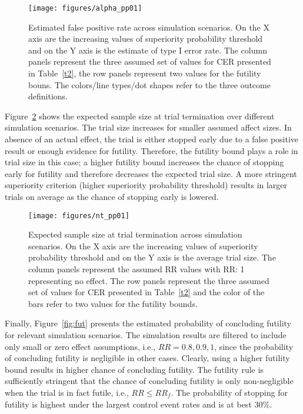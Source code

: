 \documentclass[12pt]{article}
\begin{document}
\begin{figure}[t]
	
	\centering
	\texttt{[image: figures/alpha\_pp01]}
	\caption{Estimated false positive rate across simulation scenarios. On the X axis are the increasing values of superiority probability threshold and on the Y axis is the estimate of type I error rate. The column panels represent the three assumed set of values for CER presented in Table~\ref{t2}, the row panels represent two values for the futility bouns. The colors/line types/dot shapes refer to the three outcome definitions.}
	\label{fig:alpha}
	
\end{figure}

Figure~\ref{fig:nt} shows the expected sample size at trial termination over different simulation scenarios. The trial size increases for smaller assumed affect sizes. In absence of an actual effect, the trial is either stopped early due to a false positive result or enough evidence for futility. Therefore, the futility bound plays a role in trial size in this case; a higher futility bound increases the chance of stopping early for futility and therefore decreases the expected  trial size. A more stringent superiority criterion (higher superiority probability threshold) results in larger trials on average as the chance of stopping early is lowered.

\begin{figure}[t]
	
	\centering
	\texttt{[image: figures/nt\_pp01]}
	\caption{Expected sample size at trial termination across simulation scenarios. On the X axis are the increasing values of superiority probability threshold and on the Y axis is the average trial size. The column panels represent the assumed RR values with RR: 1 representing no effect.  The row panels represent the three assumed set of values for CER presented in Table~\ref{t2} and the color of the bars refer to two values for the futility bounds.}
	\label{fig:nt}
	
\end{figure}

Finally, Figure~\ref{fig:fut} presents the estimated probability of concluding futility for relevant simulation scenarios. The simulation results are filtered to include only small or zero effect assumptions, i.e., $RR = 0.8, 0.9, 1$, since the probability of concluding futility is negligible in other cases. Clearly, using a higher futility bound results in higher chance of concluding futility. The futility rule is sufficiently stringent that the chance of concluding futility is only non-negligible when the trial is in fact futile, i.e., $RR\leq RR_f$. The probability of stopping for futility is highest under the largest control event rates and is at best 30\%.
\end{document}
